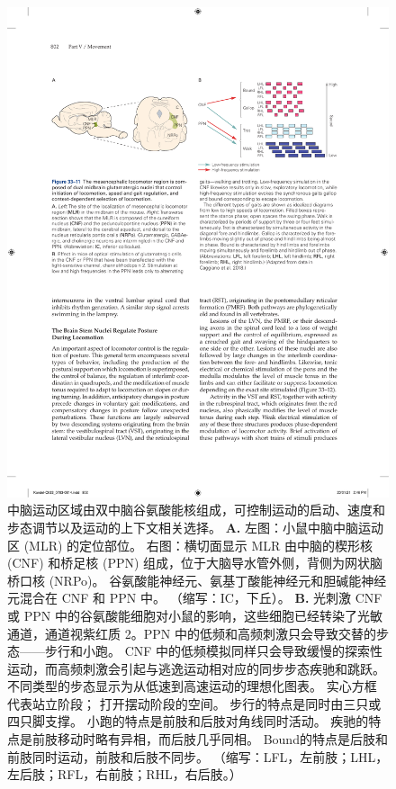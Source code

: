\begin{figure}[htbp]
	\centering
	\includegraphics[width=0.9\linewidth]{chap33/fig_33_11}
	\caption{中脑运动区域由双中脑谷氨酸能核组成，可控制运动的启动、速度和步态调节以及运动的上下文相关选择。
		\textbf{A.} 左图：小鼠中脑中脑运动区 (MLR) 的定位部位。 右图：横切面显示 MLR 由中脑的楔形核 (CNF) 和桥足核 (PPN) 组成，位于大脑导水管外侧，背侧为网状脑桥口核 (NRPo)。
		谷氨酸能神经元、氨基丁酸能神经元和胆碱能神经元混合在 CNF 和 PPN 中。 （缩写：IC，下丘）。
		\textbf{B.} 光刺激 CNF 或 PPN 中的谷氨酸能细胞对小鼠的影响，这些细胞已经转染了光敏通道，通道视紫红质 2。PPN 中的低频和高频刺激只会导致交替的步态——步行和小跑。
		CNF 中的低频模拟同样只会导致缓慢的探索性运动，而高频刺激会引起与逃逸运动相对应的同步步态疾驰和跳跃。
		不同类型的步态显示为从低速到高速运动的理想化图表。
		实心方框代表站立阶段；
		打开摆动阶段的空间。
		步行的特点是同时由三只或四只脚支撑。
		小跑的特点是前肢和后肢对角线同时活动。
		疾驰的特点是前肢移动时略有异相，而后肢几乎同相。
		Bound的特点是后肢和前肢同时运动，前肢和后肢不同步\cite{caggiano2018midbrain}。 （缩写：LFL，左前肢；LHL，左后肢；RFL，右前肢；RHL，右后肢。）}
	\label{fig:33_11}
\end{figure}


